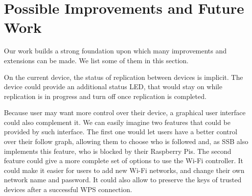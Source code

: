 \documentclass[a4paper,11pt,oneside]{report}
\begin{document}
\section{Possible Improvements and Future Work}

Our work builds a strong foundation upon which many improvements and extensions can be made. We list some of them in this section.

On the current device, the status of replication between devices is implicit. The device could provide an additional status LED, that would stay on while replication is in progress and turn off once replication is completed.

Because user may want more control over their device, a graphical user interface could also complement it. We can easily imagine two features that could be provided by such interface. The first one would let users have a better control over their follow graph, allowing them to choose who is followed and, as SSB also implements this feature, who is blocked by their Raspberry Pis. The second feature could give a more complete set of options to use the Wi-Fi controller. It could make it easier for users to add new Wi-Fi networks, and change their own network name and password. It could also allow to preserve the keys of trusted devices after a successful WPS connection.


\cleardoublepage
{}
{}
\printbibliography

\appendix


\end{document}

